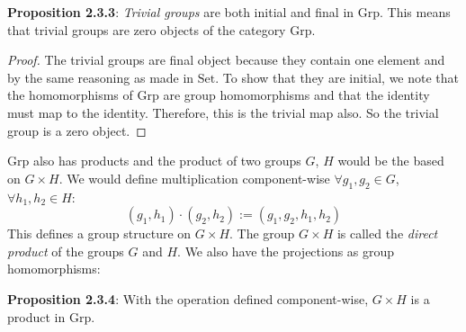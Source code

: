 \documentclass{report}
\begin{document}
\textbf{Proposition 2.3.3}: \textit{Trivial groups} are both initial and final in $\text{Grp}$. This means that trivial groups are zero objects of the category $\text{Grp}$.

\begin{proof}
    The trivial groups are final object because they contain one element and by the same reasoning as made in $\text{Set}$. To show that they are initial, we note that the homomorphisms of $\text{Grp}$ are group homomorphisms and that the identity must map to the identity. Therefore, this is the trivial map also. So the trivial group is a zero object.
\end{proof}

$\text{Grp}$ also has products and the product of two groups $G$, $H$ would be the based on $G \times H$. We would define multiplication component-wise $\forall g_{1}, g_{2} \in G$, $\forall h_{1}, h_{2} \in H$:
    \begin{equation*}
        (g_{1}, h_{1}) \cdot (g_{2}, h_{2}) := (g_{1}, g_{2}, h_{1}, h_{2})
    \end{equation*}
This defines a group structure on $G \times H$. The group $G \times H$ is called the \textit{direct product} of the groups $G$ and $H$. We also have the projections as group homomorphisms:
    \begin{center}
    \end{center}

\textbf{Proposition 2.3.4}: With the operation defined component-wise, $G \times H$ is a product in $\text{Grp}$.
\end{document}
